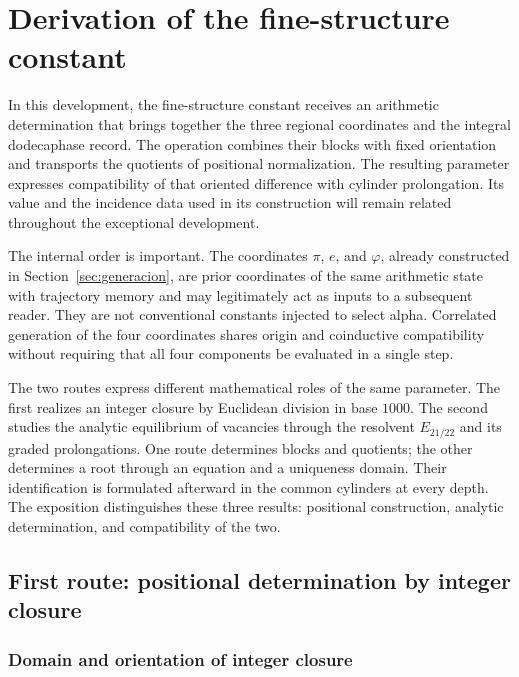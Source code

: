 \section{Derivation of the fine-structure constant}
\label{sec:alpha}

In this development, the fine-structure constant receives an arithmetic
determination that brings together the three regional coordinates and the integral
dodecaphase record. The operation combines their blocks with fixed orientation and
transports the quotients of positional normalization. The resulting
parameter expresses compatibility of that oriented difference with
cylinder prolongation. Its value and the incidence data
used in its construction will remain related throughout the
exceptional development.

The internal order is important. The coordinates \(\pi\),
\(e\), and \(\varphi\), already constructed in Section~\ref{sec:generacion}, are prior
coordinates of the same arithmetic state with trajectory memory and may legitimately act as
inputs to a subsequent reader. They are not conventional constants
injected to select alpha. Correlated generation of the four coordinates shares origin and
coinductive compatibility without requiring that all four
components be evaluated in a single step.

The two routes express different mathematical roles of the same parameter.
The first realizes an integer closure by Euclidean division in base
\(1000\). The second studies the analytic equilibrium of vacancies through
the resolvent \(E_{21/22}\) and its graded prolongations. One route
determines blocks and quotients; the other determines a root through an
equation and a uniqueness domain. Their identification is formulated afterward
in the common cylinders at every depth. The exposition distinguishes
these three results: positional construction, analytic determination,
and compatibility of the two.

\subsection{First route: positional determination by integer closure}
\subsubsection{Domain and orientation of integer closure}
\label{subsec:alpha-dominio}

